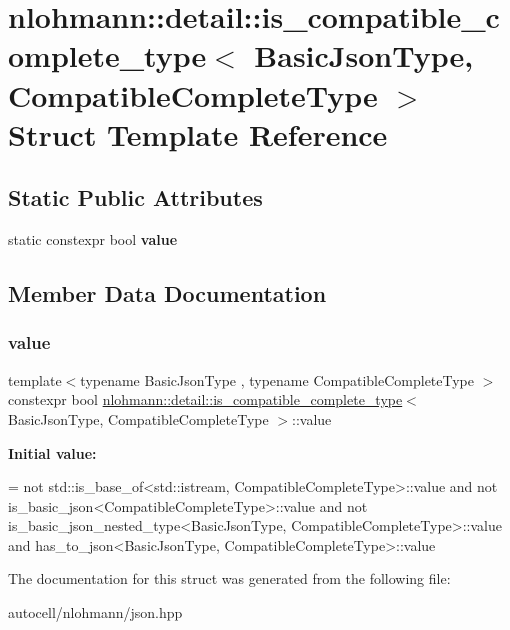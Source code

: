 \hypertarget{structnlohmann_1_1detail_1_1is__compatible__complete__type}{}\section{nlohmann\+:\+:detail\+:\+:is\+\_\+compatible\+\_\+complete\+\_\+type$<$ Basic\+Json\+Type, Compatible\+Complete\+Type $>$ Struct Template Reference}
\label{structnlohmann_1_1detail_1_1is__compatible__complete__type}
\subsection*{Static Public Attributes}
\begin{DoxyCompactItemize}
\item 
static constexpr bool {\bfseries value}
\end{DoxyCompactItemize}


\subsection{Member Data Documentation}
\mbox{\label{structnlohmann_1_1detail_1_1is__compatible__complete__type_a34bed4700a302b79feb045b6bdbda9aa}} 
\subsubsection{\texorpdfstring{value}{value}}
{\footnotesize\ttfamily template$<$typename Basic\+Json\+Type , typename Compatible\+Complete\+Type $>$ \\
constexpr bool \mbox{\hyperlink{structnlohmann_1_1detail_1_1is__compatible__complete__type}{nlohmann\+::detail\+::is\+\_\+compatible\+\_\+complete\+\_\+type}}$<$ Basic\+Json\+Type, Compatible\+Complete\+Type $>$\+::value\hspace{0.3cm}{\ttfamily [static]}}

{\bfseries Initial value\+:}
\begin{DoxyCode}
=
        not std::is\_base\_of<std::istream, CompatibleCompleteType>::value and
        not is\_basic\_json<CompatibleCompleteType>::value and
        not is\_basic\_json\_nested\_type<BasicJsonType, CompatibleCompleteType>::value and
        has\_to\_json<BasicJsonType, CompatibleCompleteType>::value
\end{DoxyCode}


The documentation for this struct was generated from the following file\+:\begin{DoxyCompactItemize}
\item 
autocell/nlohmann/json.\+hpp\end{DoxyCompactItemize}
